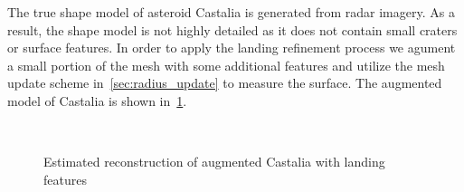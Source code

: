 The true shape model of asteroid Castalia is generated from radar imagery.
As a result, the shape model is not highly detailed as it does not contain small craters or surface features.
In order to apply the landing refinement process we agument a small portion of the mesh with some additional features and utilize the mesh update scheme in~\cref{sec:radius_update} to measure the surface.
The augmented model of Castalia is shown in~\cref{fig:bumpy_castalia}.
\begin{figure}[htbp]
    \centering
    ~
    \caption{Estimated reconstruction of augmented Castalia with landing features~\label{fig:bumpy_castalia}}
\end{figure}

